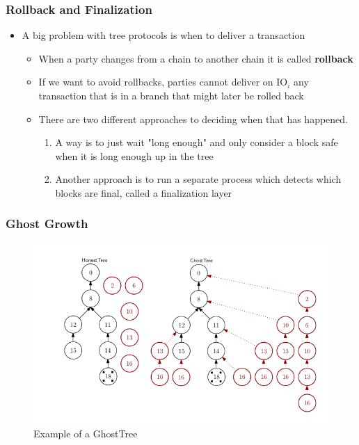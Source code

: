 \documentclass[11pt]{article}
\begin{document}
\subsubsection{Rollback and Finalization}
\label{sec:org1b81965}
\begin{itemize}
\item A big problem with tree protocols is when to deliver a transaction
\begin{itemize}
\item When a party changes from a chain to another chain it is called \textbf{rollback}
\item If we want to avoid rollbacks, parties cannot deliver on \(\text{IO}_i\) any transaction that is in a branch that might later be rolled back
\item There are two different approaches to deciding when that has happened. 
\begin{enumerate}
\item A way is to just wait "long enough" and only consider a block safe when it is long enough up in the tree
\item Another approach is to run a separate process which detects which blocks are final, called a finalization layer
\end{enumerate}
\end{itemize}
\end{itemize}

\subsubsection{Ghost Growth}
\label{sec:org90d9608}
\begin{figure}[htbp]
\centering
\includegraphics[width=.9\linewidth]{Blockchains/screenshot_2018-10-28_11-34-56.png}
\caption{\label{fig:org5950e74}
Example of a GhostTree}
\end{figure}
\end{document}
